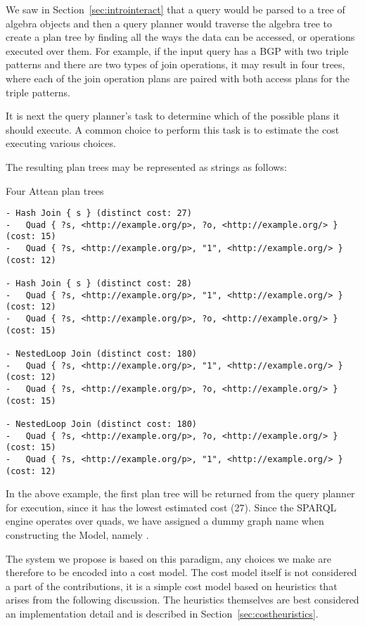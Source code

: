 We saw in Section~\ref{sec:introinteract} that a query would be parsed
to a tree of algebra objects and then a query planner would traverse
the algebra tree to create a plan tree by finding all the ways the
data can be accessed, or operations executed over them. For example,
if the input query has a BGP with two triple patterns and there are
two types of join operations, it may result in four trees, where each
of the join operation plans are paired with both access plans for the
triple patterns.

It is next the query planner's task to determine which of the possible
plans it should execute. A common choice to perform this task is to
estimate the cost executing various choices.

The resulting plan trees may be represented as strings as follows:
\begin{example}{Four Attean plan trees}
\begin{verbatim}
- Hash Join { s } (distinct cost: 27)
-   Quad { ?s, <http://example.org/p>, ?o, <http://example.org/> } (cost: 15)
-   Quad { ?s, <http://example.org/p>, "1", <http://example.org/> } (cost: 12)

- Hash Join { s } (distinct cost: 28)
-   Quad { ?s, <http://example.org/p>, "1", <http://example.org/> } (cost: 12)
-   Quad { ?s, <http://example.org/p>, ?o, <http://example.org/> } (cost: 15)

- NestedLoop Join (distinct cost: 180)
-   Quad { ?s, <http://example.org/p>, "1", <http://example.org/> } (cost: 12)
-   Quad { ?s, <http://example.org/p>, ?o, <http://example.org/> } (cost: 15)

- NestedLoop Join (distinct cost: 180)
-   Quad { ?s, <http://example.org/p>, ?o, <http://example.org/> } (cost: 15)
-   Quad { ?s, <http://example.org/p>, "1", <http://example.org/> } (cost: 12)
\end{verbatim}
\end{example}
In the above example, the first plan tree will be returned from the
query planner for execution, since it has the lowest estimated cost
(27). Since the SPARQL engine operates over quads, we have assigned a
dummy graph name when constructing the Model, namely
. 


The system we propose is based on this paradigm, any choices we make
are therefore to be encoded into a cost model. The cost model itself
is not considered a part of the contributions, it is a simple cost
model based on heuristics that arises from the following
discussion. The heuristics themselves are best considered an
implementation detail and is described in
Section~\ref{sec:costheuristics}.

